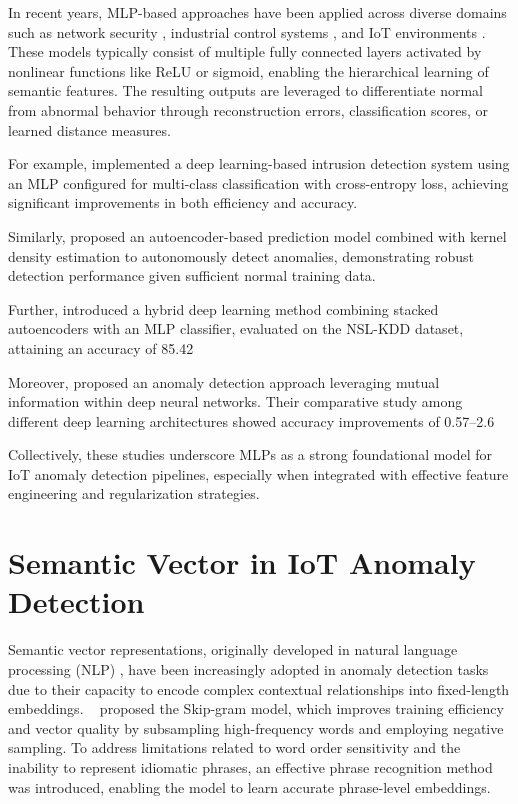 \begin{ZhChapter}
    In recent years, MLP-based approaches have been applied across diverse domains such as network security \cite{marin2005network}, industrial control systems \cite{stouffer2011guide}, and IoT environments \cite{joshitta2016security}. These models typically consist of multiple fully connected layers activated by nonlinear functions like ReLU or sigmoid, enabling the hierarchical learning of semantic features. The resulting outputs are leveraged to differentiate normal from abnormal behavior through reconstruction errors, classification scores, or learned distance measures.

    For example, \citeauthor{elghamrawy2022intrusion} \cite{elghamrawy2022intrusion} implemented a deep learning-based intrusion detection system using an MLP configured for multi-class classification with cross-entropy loss, achieving significant improvements in both efficiency and accuracy.

    Similarly, \citeauthor{esmaeili2023anomaly} \cite{esmaeili2023anomaly} proposed an autoencoder-based prediction model combined with kernel density estimation to autonomously detect anomalies, demonstrating robust detection performance given sufficient normal training data.

    Further, \citeauthor{8264962} \cite{8264962} introduced a hybrid deep learning method combining stacked autoencoders with an MLP classifier, evaluated on the NSL-KDD dataset, attaining an accuracy of 85.42%

    Moreover, \citeauthor{ahmad2021anomaly} \cite{ahmad2021anomaly} proposed an anomaly detection approach leveraging mutual information within deep neural networks. Their comparative study among different deep learning architectures showed accuracy improvements of 0.57–2.6%

    Collectively, these studies underscore MLPs as a strong foundational model for IoT anomaly detection pipelines, especially when integrated with effective feature engineering and regularization strategies.




    \section{Semantic Vector in IoT Anomaly Detection}
    Semantic vector representations, originally developed in natural language processing (NLP) \cite{resnik2010evaluation}, have been increasingly adopted in anomaly detection tasks due to their capacity to encode complex contextual relationships into fixed-length embeddings. \citeauthor{mikolov2013distributed}~\cite{mikolov2013distributed} proposed the Skip-gram model, which improves training efficiency and vector quality by subsampling high-frequency words and employing negative sampling. To address limitations related to word order sensitivity and the inability to represent idiomatic phrases, an effective phrase recognition method was introduced, enabling the model to learn accurate phrase-level embeddings.


\end{ZhChapter}
